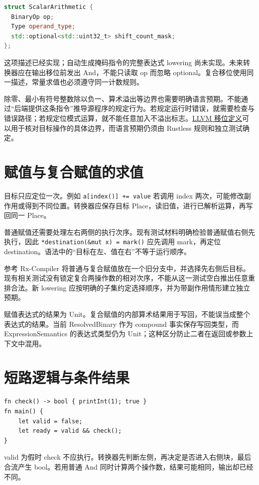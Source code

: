 \begin{lstlisting}[language=C++,caption={当前标量运算描述中的移位意图}]
struct ScalarArithmetic {
  BinaryOp op;
  Type operand_type;
  std::optional<std::uint32_t> shift_count_mask;
};
\end{lstlisting}
这项描述已经实现；自动生成掩码指令的完整表达式 lowering 尚未实现。未来转换器应在输出移位前发出 And，不能只读取 op 而忽略 optional。复合移位使用同一描述，常量求值也必须遵守同一计数规则。

除零、最小有符号整数除以负一、算术溢出等边界也需要明确语言预期。不能通过“后端提供这条指令”推导源程序的规定行为。若规定运行时错误，就需要检查与错误路径；若规定位模式运算，就不能任意加入不溢出标志。\href{https://llvm.org/docs/LangRef.html#shl-instruction}{LLVM 移位定义}可以用于核对目标操作的具体边界，而语言预期仍须由 Rustless 规则和独立测试确定。

\section{赋值与复合赋值的求值}
目标只应定位一次。例如 \texttt{a[index()] += value} 若调用 index 两次，可能修改副作用或得到不同位置。转换器应保存目标 Place，读旧值，进行已解析运算，再写回同一 Place。

普通赋值还需要处理左右两侧的执行次序。现有测试材料明确检验普通赋值右侧先执行，因此 \texttt{*destination(\&mut x) = mark()} 应先调用 mark，再定位 destination。语法中的“目标在左、值在右”不等于运行顺序。

参考 Rx-Compiler 将普通与复合赋值放在一个旧分支中，并选择先右侧后目标。现有相关测试没有锁定复合两操作数的相对次序，不能从这一测试空白推出任意重排合法。新 lowering 应按明确的子集约定选择顺序，并为带副作用情形建立独立预期。

赋值表达式的结果为 Unit。复合赋值的内部算术结果用于写回，不能误当成整个表达式的结果。当前 ResolvedBinary 作为 compound 事实保存写回类型，而 ExpressionSemantics 的表达式类型仍为 Unit；这种区分防止二者在返回或参数上下文中混用。

\section{短路逻辑与条件结果}
\begin{lstlisting}[language=Rustless,caption={不能用 eager 位运算代替的逻辑式}]
fn check() -> bool { printInt(1); true }
fn main() {
    let valid = false;
    let ready = valid && check();
}
\end{lstlisting}
valid 为假时 check 不应执行。转换器先判断左侧，再决定是否进入右侧块，最后合流产生 bool。若用普通 And 同时计算两个操作数，结果可能相同，输出却已经不同。

